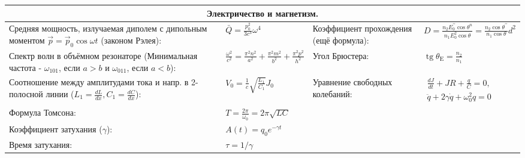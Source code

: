 \documentclass{article}
\begin{document}
\begin{tabular}{ |p{6cm}|p{3cm}|p{6cm}|p{3.5cm}|  }
\hline
\multicolumn{4}{|c|}{Электричество и магнетизм.} \\
\hline
Средняя мощность, излучаемая диполем с дипольным моментом $\vec{p}=\vec{p}_{0} \cos \omega t$ (законом Рэлея):&
$\bar{Q}=\frac{p_{0}^{2}}{3 c^{3}} \omega^{4}$                             &
Коэффициент прохождения (ещё формула):                                     &
$D=\frac{n_{2} E_{0}^{\prime \prime} \cos \theta^{n}}{n_{1} E_{0}^{2} \cos \theta}=\frac{n_{2} \cos \theta^{\prime \prime}}{n_{1} \cos \theta} d^{2}$\\
\hline
Спектр волн в объёмном резонаторе (Минимальная частота - $\omega_{101}$, если $a > b$ и $\omega_{011}$, если $a < b$): &
$\frac{\omega^{2}}{c^{2}}=\frac{\pi^{2} n^{2}}{a^{2}}+\frac{\pi^{2} m^{2}}{b^{2}}+\frac{\pi^{2} p^{2}}{h^{2}}$ &
Угол Брюстера:                                                             &
$\operatorname{tg} \theta_{\mathrm{E}}=\frac{n_2}{n_1}$                    \\
\hline
Соотношение между амплитудами тока и напр. в 2-полосной линии ($L_1 = \frac{d{L}}{d{x}}, C_1 = \frac{d{C}}{d{x}}$): &
$V_{0}=\frac{1}{c} \sqrt{\frac{L_{1}}{C_{1}}} J_{0}$                       &
Уравнение свободных колебаний:                                             &
$\begin{aligned}
 \frac{d J}{d t}+J R+\frac{q}{C}=0,\\
\ddot{q}+2 \gamma \dot{q}+\omega_{0}^{2} q=0
\end{aligned}$                                                             \\
\hline
Формула Томсона:                                                           &
$T=\frac{2 \pi}{\omega_{0}}=2 \pi \sqrt{L C}$                              &
                                                                           &
                                                                           \\
\hline
Коэффициент затухания ($\gamma$):                                          &
$A(t)=q_{0} e^{-\gamma t}$                                                 &
                                                                           &
                                                                           \\
\hline
Время затухания:                                                           &
$\tau=1 / \gamma$                                                          &
                                                                           &

\end{tabular}
\end{document}
